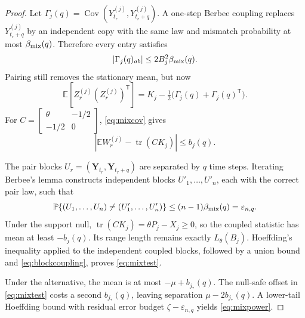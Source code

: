 \documentclass[11pt]{article}
\theoremstyle{definition}
\theoremstyle{remark}
\newcommand{\tr}{\operatorname{tr}}
\begin{document}
\begin{proof}
Let
$\Gamma_j(q)=\operatorname{Cov}(Y_{t_r}^{(j)},Y_{t_r+q}^{(j)})$.
A one-step Berbee coupling replaces $Y_{t_r+q}^{(j)}$ by an independent copy
with the same law and mismatch probability at most $\beta_{\rm mix}(q)$.
Therefore every entry satisfies
\begin{equation}
 |\Gamma_j(q)_{ab}|\leq2B_j^2\beta_{\rm mix}(q).          \label{eq:mixcov}
\end{equation}
Pairing still removes the stationary mean, but now
\[
 \mathbb E[Z_r^{(j)}(Z_r^{(j)})^{\mathsf T}]
 =K_j-\tfrac12\bigl(\Gamma_j(q)+\Gamma_j(q)^{\mathsf T}\bigr).
\]
For
$C=\left[\begin{smallmatrix}\theta&-1/2\\-1/2&0\end{smallmatrix}\right]$,
\eqref{eq:mixcov} gives
\begin{equation}
 \left|\mathbb EW_r^{(j)}-\tr(CK_j)\right|\leq b_j(q).
                                                               \label{eq:mixbias}
\end{equation}

The pair blocks
$U_r=(\mathbf Y_{t_r},\mathbf Y_{t_r+q})$ are separated by $q$ time steps.
Iterating Berbee's lemma constructs independent blocks $U'_1,\ldots,U'_n$,
each with the correct pair law, such that
\begin{equation}
 \mathbb P\{(U_1,\ldots,U_n)\neq(U'_1,\ldots,U'_n)\}
 \leq(n-1)\beta_{\rm mix}(q)=\varepsilon_{n,q}.          \label{eq:blockcoupling}
\end{equation}
Under the support null, $\tr(CK_j)=\theta P_j-X_j\geq0$, so the coupled
statistic has mean at least $-b_j(q)$.  Its range length remains exactly
$L_\theta(B_j)$.  Hoeffding's inequality applied to the independent coupled
blocks, followed by a union bound and \eqref{eq:blockcoupling}, proves
\eqref{eq:mixtest}.

Under the alternative, the mean is at most $-\mu+b_{j_*}(q)$.  The null-safe
offset in \eqref{eq:mixtest} costs a second $b_{j_*}(q)$, leaving separation
$\mu-2b_{j_*}(q)$.  A lower-tail Hoeffding bound with residual error budget
$\zeta-\varepsilon_{n,q}$ yields \eqref{eq:mixpower}.
\end{proof}
\end{document}
